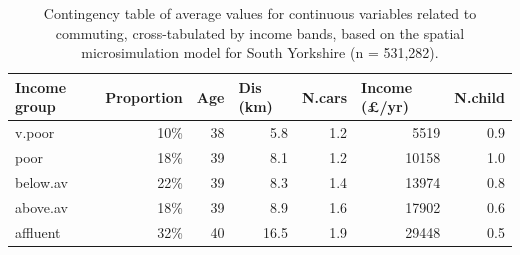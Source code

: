 \documentclass[a4paper, 11pt, twoside]{Thesis}
\begin{document}
\begin{table}[h*]
\caption[Contingency table of variables related to commuting]
{Contingency table of average values for continuous variables related to commuting,
cross-tabulated by income bands, based on the spatial microsimulation
model for South Yorkshire (n = 531,282).}
\begin{center}
\begin{tabular}{lrrrrrr}
\hline
Income group & \multicolumn{1}{l}{Proportion} & \multicolumn{1}{l}{Age} &
\multicolumn{1}{l}{Dis (km)} & \multicolumn{1}{l}{N.cars} &
\multicolumn{1}{l}{Income (\pounds/yr)} & \multicolumn{1}{l}{N.child} \\
\midrule
v.poor & 10\% & 38 & 5.8 & 1.2 & 5519 & 0.9 \\ 
poor & 18\% & 39 & 8.1 & 1.2 & 10158 & 1.0 \\ 
below.av & 22\% & 39 & 8.3 & 1.4 & 13974 & 0.8 \\ 
above.av & 18\% & 39 & 8.9 & 1.6 & 17902 & 0.6 \\ 
affluent & 32\% & 40 & 16.5 & 1.9 & 29448 & 0.5 \\ 
\end{tabular}\end{center}
\label{t:msim-res}
\end{table}
\end{document}
